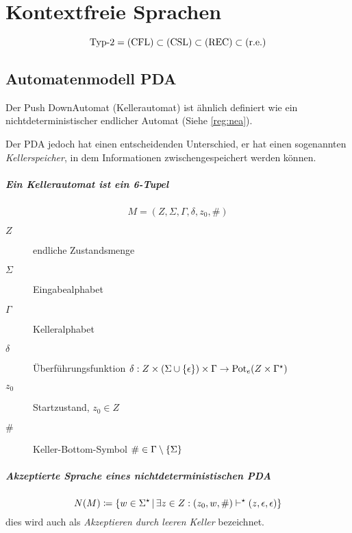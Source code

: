\chapter{Kontextfreie Sprachen}\label{sec:typ2}
\begin{equation*}
	\text{Typ-2} = \mathrm{(CFL)}\subset\mathrm{(CSL)}\subset\mathrm{(REC)}\subset\mathrm{(r.e.)}
\end{equation*}
\section{Automatenmodell PDA}\label{cfl:pda}
Der Push DownAutomat (Kellerautomat) ist ähnlich definiert wie ein nichtdeterministischer endlicher Automat (Siehe \autoref{reg:nea}).

Der PDA jedoch hat einen entscheidenden Unterschied, er hat einen sogenannten \emph{Kellerspeicher}, in dem Informationen zwischengespeichert werden können.

\paragraph{Ein Kellerautomat ist ein 6-Tupel}
\begin{equation*}
	M=(Z,\Sigma,\Gamma,\delta,z_0,\#)
\end{equation*}
\begin{description}
	\item[$Z$] endliche Zustandsmenge
	\item[$\Sigma$] Eingabealphabet
	\item[$\Gamma$] Kelleralphabet
	\item[$\delta$] Überführungsfunktion $\delta:Z\times(\Sigma\cup\left\{ \epsilon \right\})\times\Gamma\rightarrow \mathrm{Pot}_e(Z\times\Gamma^\star)$
	\item[$z_0$] Startzustand, $z_0\in Z$
	\item[$\#$] Keller-Bottom-Symbol $\#\in \Gamma\setminus\left\{ \Sigma \right\}$
\end{description}

\paragraph{Akzeptierte Sprache eines nichtdeterministischen PDA}
\begin{equation*}
	N(M)\coloneqq\left\{ w\in \Sigma^\star \,\middle|\, \exists z\in Z: (z_0, w, \#)\vdash^\star (z,\epsilon,\epsilon) \right\}
\end{equation*}
dies wird auch als \emph{Akzeptieren durch leeren Keller} bezeichnet.

